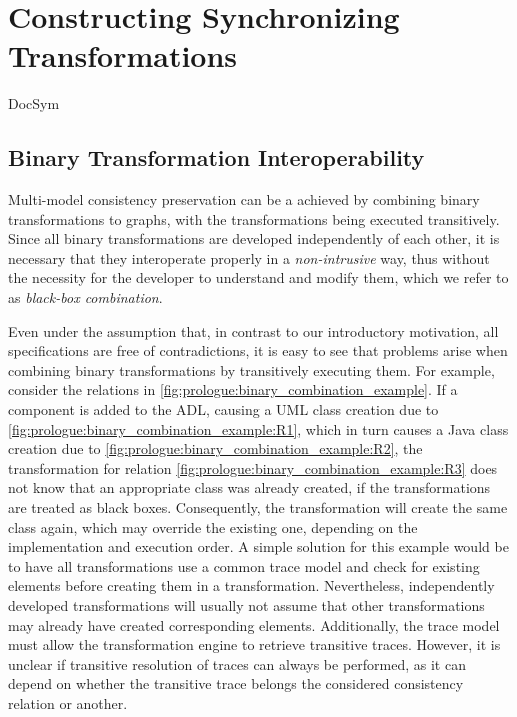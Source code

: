 \chapter{Constructing Synchronizing Transformations
}
\label{chap:synchronization}



\begin{copiedFrom}{DocSym}

\section{Binary Transformation Interoperability}

Multi-model consistency preservation can be a achieved by combining binary transformations to graphs, %
with the transformations being executed transitively.
Since all binary transformations are developed independently of each other, it is necessary that they interoperate properly in a \emph{non-intrusive} way, thus without the necessity for the developer to understand and modify them, which we refer to as \emph{black-box combination}.

Even under the assumption that, in contrast to our introductory motivation, all specifications are free of contradictions, it is easy to see that problems arise when combining binary transformations by transitively executing them.
For example, consider the relations in \autoref{fig:prologue:binary_combination_example}.
If a component is added to the \ac{ADL}, causing a \ac{UML} class creation due to \ref{fig:prologue:binary_combination_example:R1}, which in turn causes a Java class creation due to \ref{fig:prologue:binary_combination_example:R2}, the transformation for relation \ref{fig:prologue:binary_combination_example:R3} does not know that an appropriate class was already created, if the transformations are treated as black boxes.
Consequently, the transformation will create the same class again, which may override the existing one, depending on the implementation and execution order.
A simple solution for this example would be to have all transformations use a common trace model and check for existing elements before creating them in a transformation.
Nevertheless, independently developed transformations will usually not assume that %
other transformations may already have created corresponding elements.
Additionally, the trace model must allow the transformation engine to retrieve transitive traces.
However, it is unclear if transitive resolution of traces can always be performed, as it can depend on whether the transitive trace belongs the considered consistency relation or another.


\end{copiedFrom}
